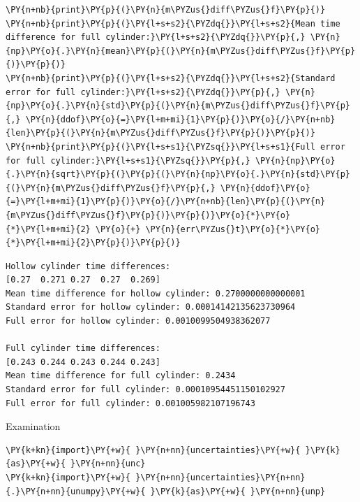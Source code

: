 \begin{tcolorbox}[breakable, size=fbox, boxrule=1pt, pad at break*=1mm,colback=cellbackground, colframe=cellborder]
\begin{Verbatim}[commandchars=\\\{\}]
\PY{n+nb}{print}\PY{p}{(}\PY{n}{m\PYZus{}diff\PYZus{}f}\PY{p}{)}
\PY{n+nb}{print}\PY{p}{(}\PY{l+s+s2}{\PYZdq{}}\PY{l+s+s2}{Mean time difference for full cylinder:}\PY{l+s+s2}{\PYZdq{}}\PY{p}{,} \PY{n}{np}\PY{o}{.}\PY{n}{mean}\PY{p}{(}\PY{n}{m\PYZus{}diff\PYZus{}f}\PY{p}{)}\PY{p}{)}
\PY{n+nb}{print}\PY{p}{(}\PY{l+s+s2}{\PYZdq{}}\PY{l+s+s2}{Standard error for full cylinder:}\PY{l+s+s2}{\PYZdq{}}\PY{p}{,} \PY{n}{np}\PY{o}{.}\PY{n}{std}\PY{p}{(}\PY{n}{m\PYZus{}diff\PYZus{}f}\PY{p}{,} \PY{n}{ddof}\PY{o}{=}\PY{l+m+mi}{1}\PY{p}{)}\PY{o}{/}\PY{n+nb}{len}\PY{p}{(}\PY{n}{m\PYZus{}diff\PYZus{}f}\PY{p}{)}\PY{p}{)}
\PY{n+nb}{print}\PY{p}{(}\PY{l+s+s1}{\PYZsq{}}\PY{l+s+s1}{Full error for full cylinder:}\PY{l+s+s1}{\PYZsq{}}\PY{p}{,} \PY{n}{np}\PY{o}{.}\PY{n}{sqrt}\PY{p}{(}\PY{p}{(}\PY{n}{np}\PY{o}{.}\PY{n}{std}\PY{p}{(}\PY{n}{m\PYZus{}diff\PYZus{}f}\PY{p}{,} \PY{n}{ddof}\PY{o}{=}\PY{l+m+mi}{1}\PY{p}{)}\PY{o}{/}\PY{n+nb}{len}\PY{p}{(}\PY{n}{m\PYZus{}diff\PYZus{}f}\PY{p}{)}\PY{p}{)}\PY{o}{*}\PY{o}{*}\PY{l+m+mi}{2} \PY{o}{+} \PY{n}{err\PYZus{}t}\PY{o}{*}\PY{o}{*}\PY{l+m+mi}{2}\PY{p}{)}\PY{p}{)}
\end{Verbatim}
\end{tcolorbox}

    \begin{Verbatim}[commandchars=\\\{\}]
Hollow cylinder time differences:
[0.27  0.271 0.27  0.27  0.269]
Mean time difference for hollow cylinder: 0.2700000000000001
Standard error for hollow cylinder: 0.00014142135623730964
Full error for hollow cylinder: 0.0010099504938362077

Full cylinder time differences:
[0.243 0.244 0.243 0.244 0.243]
Mean time difference for full cylinder: 0.2434
Standard error for full cylinder: 0.00010954451150102927
Full error for full cylinder: 0.001005982107196743
    \end{Verbatim}

    Examination

    \begin{tcolorbox}[breakable, size=fbox, boxrule=1pt, pad at break*=1mm,colback=cellbackground, colframe=cellborder]
\begin{Verbatim}[commandchars=\\\{\}]
\PY{k+kn}{import}\PY{+w}{ }\PY{n+nn}{uncertainties}\PY{+w}{ }\PY{k}{as}\PY{+w}{ }\PY{n+nn}{unc}
\PY{k+kn}{import}\PY{+w}{ }\PY{n+nn}{uncertainties}\PY{n+nn}{.}\PY{n+nn}{unumpy}\PY{+w}{ }\PY{k}{as}\PY{+w}{ }\PY{n+nn}{unp}
\end{Verbatim}
\end{tcolorbox}

